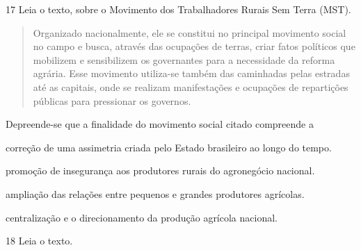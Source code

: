 \num{17} Leia o texto, sobre o Movimento dos Trabalhadores Rurais Sem Terra (MST).

\begin{quote}
Organizado nacionalmente, ele se constitui no principal
movimento social no campo e busca, através das ocupações de terras,
criar fatos políticos que mobilizem e sensibilizem os governantes para a
necessidade da reforma agrária. Esse movimento utiliza-se também das
caminhadas pelas estradas até as capitais, onde se realizam
manifestações e ocupações de repartições públicas para pressionar os
governos.

\end{quote}

Depreende-se que a finalidade do movimento social citado compreende a

\begin{escolha}
\item  correção de uma assimetria criada pelo Estado brasileiro ao longo do tempo.

\item  promoção de insegurança aos produtores rurais do agronegócio nacional.

\item  ampliação das relações entre pequenos e grandes produtores agrícolas.

\item  centralização e o direcionamento da produção agrícola nacional.
\end{escolha}

\num{18} Leia o texto.

